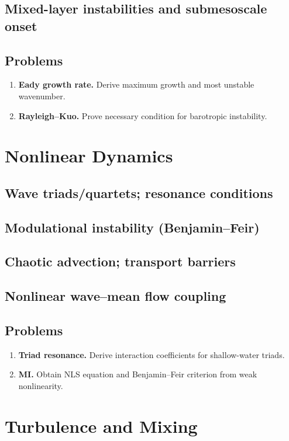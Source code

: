 \documentclass[12pt]{book}
\begin{document}
\section{Mixed-layer instabilities and submesoscale onset}
\section*{Problems}
\begin{enumerate}
  \item \textbf{Eady growth rate.} Derive maximum growth and most unstable wavenumber.
  \item \textbf{Rayleigh--Kuo.} Prove necessary condition for barotropic instability.
\end{enumerate}

\chapter{Nonlinear Dynamics}
\section{Wave triads/quartets; resonance conditions}
\section{Modulational instability (Benjamin--Feir)}
\section{Chaotic advection; transport barriers}
\section{Nonlinear wave--mean flow coupling}
\section*{Problems}
\begin{enumerate}
  \item \textbf{Triad resonance.} Derive interaction coefficients for shallow-water triads.
  \item \textbf{MI.} Obtain NLS equation and Benjamin--Feir criterion from weak nonlinearity.
\end{enumerate}

\chapter{Turbulence and Mixing}
\end{document}
